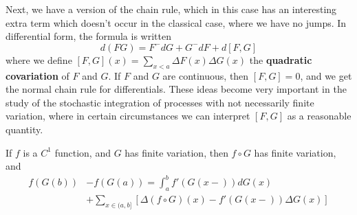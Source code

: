 Next, we have a version of the chain rule, which in this case has an interesting extra term which doesn't occur in the classical case, where we have no jumps. In differential form, the formula is written
%
\[ d(FG) = F^-dG + G^-dF + d[F,G] \]
%
where we define $[F,G](x) = \sum_{x < a} \Delta F(x) \Delta G(x)$ the {\bf quadratic covariation} of $F$ and $G$. If $F$ and $G$ are continuous, then $[F,G] = 0$, and we get the normal chain rule for differentials. These ideas become very important in the study of the stochastic integration of processes with not necessarily finite variation, where in certain circumstances we can interpret $[F,G]$ as a reasonable quantity.

\begin{theorem}
    If $f$ is a $C^1$ function, and $G$ has finite variation, then $f \circ G$ has finite variation, and
    \begin{align*}
        f(G(b))& - f(G(a)) = \int_a^b f'(G(x-)) dG(x)\\
        &+ \sum_{x \in (a,b]} [\Delta (f \circ G)(x) - f'(G(x-)) \Delta G(x)]
    \end{align*}
\end{theorem}
